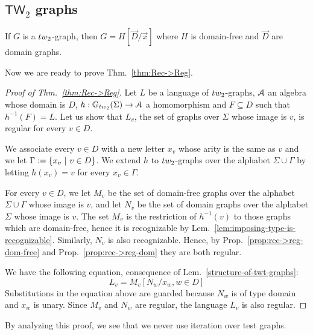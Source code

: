 \subsection{$\mathsf{TW}_2$ graphs}

\begin{lemma}\label{structure-of-twt-graphs}
If $G$ is a $\TWT$-graph, then $G=H[\vec{D}/\vec{x}]$ where $H$ is domain-free and $\vec{D}$ are domain graphs. 
\end{lemma}

Now we are ready to prove Thm.~\ref{thm:Rec->Reg}.
\begin{proof}[Proof of Thm.~\ref{thm:Rec->Reg}]
Let $L$ be a language of $\TWT$-graphs, $\mathcal A$ an algebra whose domain is $D$, $h:\mathbb{G}_\TWT(\Sigma) \to \A$ a homomorphism and $F\subseteq D$ such that $h^{-1}(F)=L$. Let us show that $L_v$, the set of graphs over $\Sigma$ whose image  is $v$,  is regular for every $v\in D$. 
\medskip

We associate every $v\in D$ with a new letter $x_v$ whose arity is the same as $v$ and we let  $\Gamma:=\left\{x_v\ | \ v\in D\right\}$.   We extend  $h$ to $\TWT$-graphs over the alphabet $\Sigma \cup \Gamma$ by letting $h(x_v)=v$ for every $x_v\in\Gamma$. 
\medskip

For every $v\in D$, we let $M_v$ be the set of domain-free graphs over the alphabet $\Sigma\cup \Gamma$ whose image is $v$, and let $N_v$ be the set of domain graphs over the alphabet $\Sigma$ whose image is $v$. The set $M_v$ is the restriction of $h^{-1}(v)$ to those graphs which are domain-free, hence it is recognizable by Lem.~\ref{lem:imposing-type-is-recognizable}. Similarly, $N_v$ is also recognizable. Hence, by Prop.~\ref{prop:rec->reg-dom-free} and Prop.~\ref{prop:rec->reg-dom} they are both regular.  

\medskip
We have the following equation, consequence of Lem.~\ref{structure-of-twt-graphs}:
$$ L_v=M_v[N_w/x_w, w\in D]$$
Substitutions in the equation above are guarded because $N_w$ is of type domain and $x_w$ is unary.  Since $M_v$ and $N_w$ are regular, the language $L_v$ is also regular.
\end{proof}
\begin{remark}
By analyzing this proof, we see that we never use iteration over test graphs. 
\end{remark}